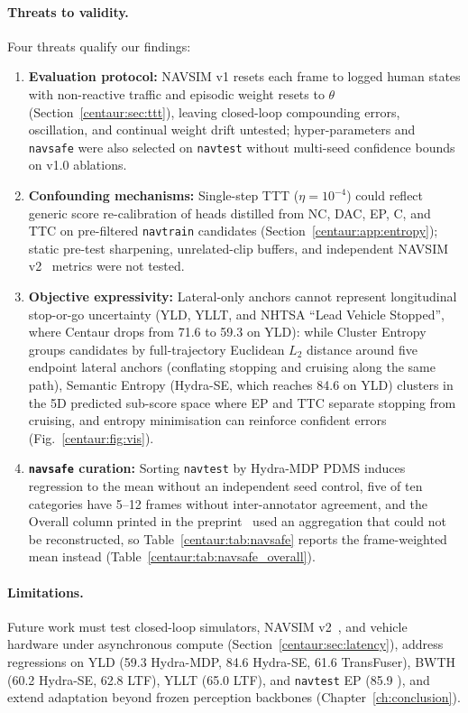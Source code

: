 \paragraph{Threats to validity.} Four threats qualify our findings:
\begin{enumerate}[leftmargin=*]
  \item \textbf{Evaluation protocol:} NAVSIM v1 resets each frame to logged human states with non-reactive traffic and episodic weight resets to $\theta$ (Section~\ref{centaur:sec:ttt}), leaving closed-loop compounding errors, oscillation, and continual weight drift untested; hyper-parameters and \texttt{navsafe} were also selected on \texttt{navtest} without multi-seed confidence bounds on v1.0 ablations.
  \item \textbf{Confounding mechanisms:} Single-step TTT ($\eta=10^{-4}$) could reflect generic score re-calibration of heads distilled from NC, DAC, EP, C, and TTC on pre-filtered \texttt{navtrain} candidates (Section~\ref{centaur:app:entropy}); static pre-test sharpening, unrelated-clip buffers, and independent NAVSIM v2~\cite{cao2025pseudo} metrics were not tested.
  \item \textbf{Objective expressivity:} Lateral-only anchors cannot represent longitudinal stop-or-go uncertainty (YLD, YLLT, and NHTSA ``Lead Vehicle Stopped'', where Centaur drops from 71.6 to 59.3 on YLD): while Cluster Entropy groups candidates by full-trajectory Euclidean $L_2$ distance around five endpoint lateral anchors (conflating stopping and cruising along the same path), Semantic Entropy (Hydra-SE, which reaches 84.6 on YLD) clusters in the 5D predicted sub-score space where EP and TTC separate stopping from cruising, and entropy minimisation can reinforce confident errors~\cite{wang2022cotta} (Fig.~\ref{centaur:fig:vis}).
  \item \textbf{\texttt{navsafe} curation:} Sorting \texttt{navtest} by Hydra-MDP PDMS induces regression to the mean without an independent seed control, five of ten categories have 5--12 frames without inter-annotator agreement, and the Overall column printed in the preprint~\cite{sima2024centaur} used an aggregation that could not be reconstructed, so Table~\ref{centaur:tab:navsafe} reports the frame-weighted mean instead (Table~\ref{centaur:tab:navsafe_overall}).
\end{enumerate}

\paragraph{Limitations.} Future work must test closed-loop simulators, NAVSIM v2~\cite{cao2025pseudo}, and vehicle hardware under asynchronous compute (Section~\ref{centaur:sec:latency}), address regressions on YLD (59.3  Hydra-MDP, 84.6 Hydra-SE, 61.6 TransFuser), BWTH (60.2  Hydra-SE, 62.8 LTF), YLLT (65.0  LTF), and \texttt{navtest} EP (85.9 ), and extend adaptation beyond frozen perception backbones (Chapter~\ref{ch:conclusion}).

